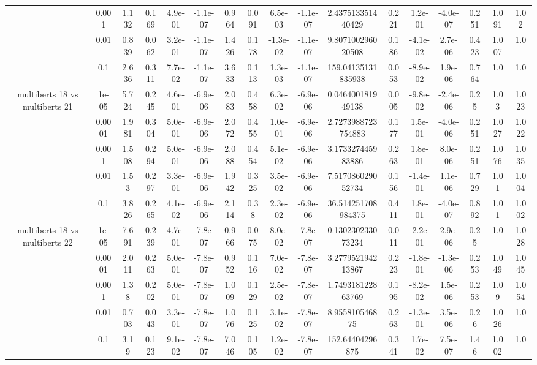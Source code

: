 \begin{tabular}{|c|c|c|c|c|c|c|c|c|c|c|c|c|c|c|c|c|}
 & 0.001 & 1.132 & 0.169 & 4.9e-01 & -1.1e-07 & 0.964 & 0.091 & 6.5e-03 & -1.1e-07 & 2.437513351440429 & 0.221 & 1.2e-01 & -4.0e-07 & 0.251 & 1.091 & 1.02 \\
 & 0.01 & 0.839 & 0.062 & 3.2e-01 & -1.1e-07 & 1.426 & 0.178 & -1.3e-02 & -1.1e-07 & 9.807100296020508 & 0.186 & -4.1e-02 & 2.7e-06 & 0.423 & 1.007 & 1.0 \\
 & 0.1 & 2.636 & 0.311 & 7.7e-02 & -1.1e-07 & 3.633 & 0.113 & 1.3e-03 & -1.1e-07 & 159.04135131835938 & 0.053 & -8.9e-02 & 1.9e-06 & 0.764 & 1.0 & 1.0 \\
\hline
\multirow{5}{*}{multiberts 18 vs multiberts 21} & 1e-05 & 5.724 & 0.245 & 4.6e-01 & -6.9e-06 & 2.083 & 0.458 & 6.3e-02 & -6.9e-06 & 0.046400181949138 & 0.005 & -9.8e-02 & -2.4e-06 & 0.25 & 1.03 & 1.023 \\
 & 0.0001 & 1.981 & 0.304 & 5.0e-01 & -6.9e-06 & 2.072 & 0.455 & 1.0e-01 & -6.9e-06 & 2.7273988723754883 & 0.177 & 1.5e-01 & -4.0e-06 & 0.251 & 1.027 & 1.022 \\
 & 0.001 & 1.508 & 0.294 & 5.0e-01 & -6.9e-06 & 2.088 & 0.454 & 5.1e-02 & -6.9e-06 & 3.173327445983886 & 0.263 & 1.8e-01 & 8.0e-06 & 0.251 & 1.076 & 1.035 \\
 & 0.01 & 1.53 & 0.297 & 3.3e-01 & -6.9e-06 & 1.942 & 0.325 & 3.5e-02 & -6.9e-06 & 7.517086029052734 & 0.156 & -1.4e-01 & 1.1e-06 & 0.729 & 1.01 & 1.004 \\
 & 0.1 & 3.826 & 0.265 & 4.1e-02 & -6.9e-06 & 2.114 & 0.38 & 2.3e-02 & -6.9e-06 & 36.514251708984375 & 0.411 & 1.8e-01 & -4.0e-07 & 0.892 & 1.01 & 1.002 \\
\hline
\multirow{5}{*}{multiberts 18 vs multiberts 22} & 1e-05 & 7.691 & 0.239 & 4.7e-01 & -7.8e-07 & 0.966 & 0.075 & 8.0e-02 & -7.8e-07 & 0.130230233073234 & 0.011 & -2.2e-01 & 2.9e-06 & 0.25 & 1.0 & 1.028 \\
 & 0.0001 & 2.011 & 0.263 & 5.0e-01 & -7.8e-07 & 0.952 & 0.116 & 7.0e-02 & -7.8e-07 & 3.277952194213867 & 0.223 & -1.8e-01 & -1.3e-06 & 0.253 & 1.049 & 1.045 \\
 & 0.001 & 1.38 & 0.202 & 5.0e-01 & -7.8e-07 & 1.009 & 0.129 & 2.5e-02 & -7.8e-07 & 1.749318122863769 & 0.195 & -8.2e-02 & 1.5e-06 & 0.253 & 1.09 & 1.054 \\
 & 0.01 & 0.703 & 0.043 & 3.3e-01 & -7.8e-07 & 1.076 & 0.125 & 3.1e-02 & -7.8e-07 & 8.955810546875 & 0.263 & -1.3e-01 & 3.5e-06 & 0.26 & 1.026 & 1.0 \\
 & 0.1 & 3.19 & 0.123 & 9.1e-02 & -7.8e-07 & 7.046 & 0.105 & 1.2e-02 & -7.8e-07 & 152.64404296875 & 0.341 & 1.7e-02 & 7.5e-07 & 1.46 & 1.002 & 1.0 \\

\end{tabular}
